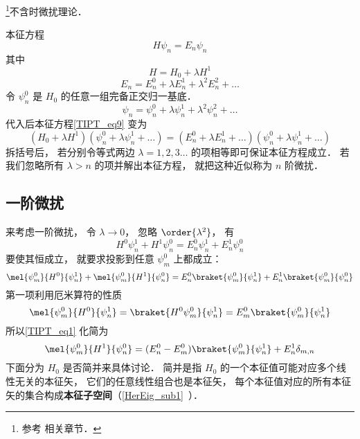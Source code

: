 
\begin{issues}
\issueDraft
{}
\end{issues}


\footnote{参考 \cite{GriffQ} \cite{Shankar} \cite{Sakurai} \cite{Merzbacher} 相关章节．}不含时微扰理论．

本征方程
\begin{equation}\label{TIPT_eq9}
H \psi_n = E_n \psi_n
\end{equation}
其中
\begin{equation}\label{TIPT_eq3}
H = H_0 + \lambda H^1
\end{equation}
\begin{equation}
E_n = E_n^0 + \lambda E_n^1 + \lambda^2 E_n^2 + \dots
\end{equation}
令 $\psi_n^0$ 是 $H_0$ 的任意一组完备正交归一基底．
\begin{equation}
\psi_n = \psi_n^0 + \lambda\psi_n^1 + \lambda^2 \psi_n^2 + \dots
\end{equation}
代入后本征方程\autoref{TIPT_eq9} 变为
\begin{equation}
(H_0 + \lambda H^1)(\psi_n^0 + \lambda\psi_n^1 + \dots) = (E_n^0 + \lambda E_n^1 + \dots)(\psi_n^0 + \lambda\psi_n^1 + \dots)
\end{equation}
拆括号后， 若分别令等式两边 $\lambda = 1,2,3\dots$ 的项相等即可保证本征方程成立． 若我们忽略所有 $\lambda > n$ 的项并解出本征方程， 就把这种近似称为 $n$ 阶微扰．

\subsection{一阶微扰}
来考虑一阶微扰， 令 $\lambda \to 0$， 忽略 $\order{\lambda^2}$， 有
\begin{equation}
H^0\psi_n^1 + H^1 \psi_n^0 = E_n^0 \psi_n^1 + E_n^1 \psi_n^0
\end{equation}
要使其恒成立， 就要求投影到任意 $\psi_m^0$ 上都成立：
\begin{equation}\label{TIPT_eq1}
\mel{\psi_m^0}{H^0}{\psi_n^1} + \mel{\psi_m^0}{H^1}{\psi_n^0} = E_n^0 \braket{\psi_m^0}{\psi_n^1} + E_n^1 \braket{\psi_m^0}{\psi_n^0}
\end{equation}
第一项利用厄米算符的性质
\begin{equation}
\mel{\psi_m^0}{H^0}{\psi_n^1} = \braket{H^0\psi_m^0}{\psi_n^1} = E_m^0\braket{\psi_m^0}{\psi_n^1}
\end{equation}
所以\autoref{TIPT_eq1} 化简为
\begin{equation}\label{TIPT_eq2}
\mel{\psi_m^0}{H^1}{\psi_n^0} = (E_n^0 - E_m^0) \braket{\psi_m^0}{\psi_n^1} + E_n^1 \delta_{m,n}
\end{equation}
下面分为 $H_0$ 是否简并来具体讨论． 简并是指 $H_0$ 的一个本征值可能对应多个线性无关的本征矢， 它们的任意线性组合也是本征矢， 每个本征值对应的所有本征矢的集合构成\textbf{本征子空间}（\autoref{HerEig_sub1}~）．

